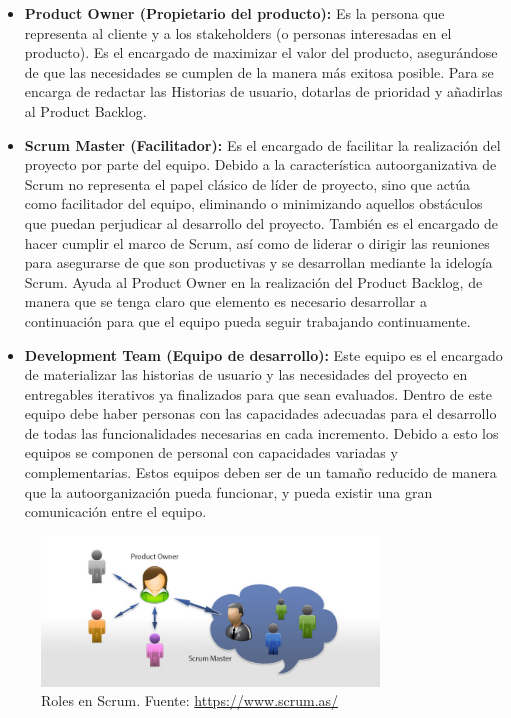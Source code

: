 \begin{itemize}
\item \textbf{Product Owner (Propietario del producto):} Es la persona que representa al cliente y a los stakeholders (o personas interesadas en el producto). Es el encargado de maximizar el valor del producto, asegurándose de que las necesidades se cumplen de la manera más exitosa posible. Para se encarga de redactar las Historias de usuario, dotarlas de prioridad y añadirlas al Product Backlog.

\item \textbf{Scrum Master (Facilitador):} Es el encargado de facilitar la realización del proyecto por parte del equipo. Debido a la característica autoorganizativa de Scrum no representa el papel clásico de líder de proyecto, sino que actúa como facilitador del equipo, eliminando o minimizando aquellos obstáculos que puedan perjudicar al desarrollo del proyecto. También es el encargado de hacer cumplir el marco de Scrum, así como de liderar o dirigir las reuniones para asegurarse de que son productivas y se desarrollan mediante la idelogía Scrum. Ayuda al Product Owner en la realización del Product Backlog, de manera que se tenga claro que elemento es necesario desarrollar a continuación para que el equipo pueda seguir trabajando continuamente.

\item \textbf{Development Team (Equipo de desarrollo):} Este equipo es el encargado de materializar las historias de usuario y las necesidades del proyecto en entregables iterativos ya finalizados para que sean evaluados. Dentro de este equipo debe haber personas con las capacidades adecuadas para el desarrollo de todas las funcionalidades necesarias en cada incremento. Debido a esto los equipos se componen de personal con capacidades variadas y complementarias. Estos equipos deben ser de un tamaño reducido de manera que la autoorganización pueda funcionar, y pueda existir una gran comunicación entre el equipo. 
\end{itemize} 

\begin{figure}[!h]
\begin{center}
\includegraphics[width=0.8\textwidth]{./figures/scrum-roles.jpg}
\caption[Roles en Scrum]{Roles en Scrum. Fuente: \href{https://www.scrum.as/}{https://www.scrum.as/}}
\label{fig:scrum-roles}
\end{center}
\end{figure}

